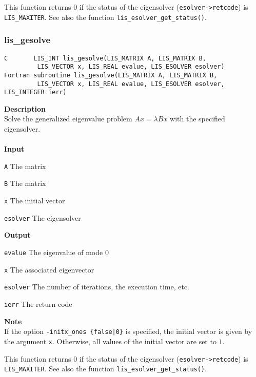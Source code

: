 \documentclass[a4paper]{article}
\newcommand{\namelistlabel}[1]{\mbox{#1}\hfill}
\newenvironment{namelist}[1]{%
\begin{list}{}
  {\let\makelabel\namelistlabel
  \settowidth{\labelwidth}{#1}
  \setlength{\leftmargin}{1.1\labelwidth}}
  }{%
\end{list}}
\begin{document}
This function returns 0 if the status of the eigensolver ({\tt esolver->retcode})
is {\tt LIS\_MAXITER}. See also the function
{\tt lis\_esolver\_get\_status()}. 

\newpage
\subsubsection{lis\_gesolve}
\begin{screen}
\verb|C       LIS_INT lis_gesolve(LIS_MATRIX A, LIS_MATRIX B,|\\ 
\verb|         LIS_VECTOR x, LIS_REAL evalue, LIS_ESOLVER esolver)|\\
\verb|Fortran subroutine lis_gesolve(LIS_MATRIX A, LIS_MATRIX B,|\\
\verb|         LIS_VECTOR x, LIS_REAL evalue, LIS_ESOLVER esolver, LIS_INTEGER ierr)|
\end{screen}
{\bf Description}\\
\indent
Solve the generalized eigenvalue problem $Ax = \lambda Bx$ with the specified eigensolver.
\\ \\
\noindent
{\bf Input}
\begin{namelist}{XXXXXXXXXXXXXXXXXXXX}
\item[\tt A] The matrix
\item[\tt B] The matrix  
\item[\tt x] The initial vector
\item[\tt esolver] The eigensolver
\end{namelist}
{\bf Output}
\begin{namelist}{XXXXXXXXXXXXXXXXXXXX}
\item[\tt evalue] The eigenvalue of mode 0
\item[\tt x] The associated eigenvector
\item[\tt esolver] The number of iterations, the execution time, etc.
\item[\tt ierr] The return code
\end{namelist}
{\bf Note}\\
\indent
If the option {\tt -initx\_ones \{false|0\}} is specified, the initial
vector is given by the argument {\tt x}.
Otherwise, all values of the initial vector are set to $1$. 

This function returns 0 if the status of the eigensolver ({\tt esolver->retcode})
is {\tt LIS\_MAXITER}. See also the function
{\tt lis\_esolver\_get\_status()}. 

\newpage
\end{document}
